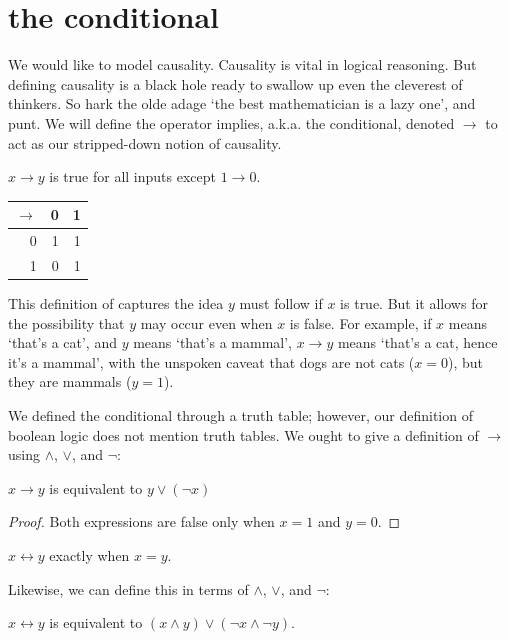 \documentclass{scrbook}
\renewcommand{\implies}{\to}
\renewcommand{\iff}{\leftrightarrow}
\begin{document}
\section[The Conditional]{the conditional}
We would like to model causality. Causality is vital in logical reasoning. But defining causality is a black hole ready to swallow up even the cleverest of thinkers. So hark the olde adage `the best mathematician is a lazy one', and punt. We will define the operator implies, a.k.a. the conditional, denoted $\implies$ to act as our stripped-down notion of causality. 
\begin{defn}[implies $\implies$]
  $x\implies y$ is true for all inputs except $1\implies 0$. 
\begin{center}  
\begin{tabular}{r|rr}
$\implies$ & 0 & 1 \\
\hline
0 & 1 & 1 \\
1 & 0 & 1 \\
\end{tabular}
\end{center}
\end{defn}
This definition of captures the idea $y$ must follow if $x$ is true. But it allows for the possibility that $y$ may occur even when $x$ is false. For example, if $x$ means `that's a cat', and $y$ means `that's a mammal', $x\implies y$ means `that's a cat, hence it's a mammal', with the unspoken caveat that dogs are not cats ($x=0$), but they are mammals ($y=1$). 

We defined the conditional through a truth table; however, our definition of boolean logic does not mention truth tables. We ought to give a definition of $\implies$ using $\wedge$, $\vee$, and $\neg$:
\begin{theorem}
  $x\implies y$ is equivalent to $y \vee (\neg x)$
\end{theorem}
\begin{proof}
  Both expressions are false only when $x=1$ and $y=0$. 
\end{proof}

\begin{defn}[logical equivalence $\iff$]
  $x\iff y$ exactly when $x = y$. 
\end{defn}
Likewise, we can define this in terms of $\wedge$, $\vee$, and $\neg$:
\begin{theorem}
  $x\iff y$ is equivalent to $(x \wedge y) \vee (\neg x \wedge \neg y)$. 
\end{theorem}
\end{document}
